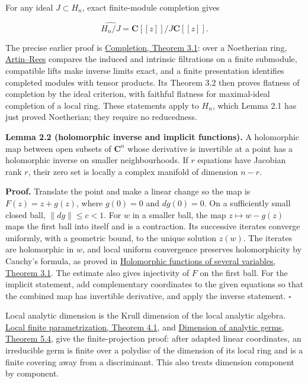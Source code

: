 \documentclass[11pt]{article}
\begin{document}
For any ideal \(J\subset H_n\), exact finite-module completion gives

\[
\widehat{H_n/J}=\mathbf C[[z]]/J\mathbf C[[z]].
\]

The precise earlier proof is
\href{../../../../../../AG-CA/AG-CA-19.html\#3-noetherian-exactness-tensoring-and-flatness}{Completion,
Theorem 3.1}: over a Noetherian ring, \href{../../../../../../AG-CA/AG-CA-03.html\#5-intersecting-a-filtration-with-a-submodule}{Artin--Rees} compares the induced
and intrinsic filtrations on a finite submodule, compatible lifts make
inverse limits exact, and a finite presentation identifies completed
modules with tensor products. Its Theorem 3.2 then proves flatness of
completion by the ideal criterion, with faithful flatness for
maximal-ideal completion of a local ring. These statements apply to
\(H_n\), which Lemma 2.1 has just proved Noetherian; they require no
reducedness.

\textbf{Lemma 2.2 (holomorphic inverse and implicit functions).} A
holomorphic map between open subsets of \(\mathbf C^n\) whose derivative
is invertible at a point has a holomorphic inverse on smaller
neighbourhoods. If \(r\) equations have Jacobian rank \(r\), their zero
set is locally a complex manifold of dimension \(n-r\).

\textbf{Proof.} Translate the point and make a linear change so the map
is \(F(z)=z+g(z)\), where \(g(0)=0\) and \(dg(0)=0\). On a sufficiently
small closed ball, \(\|dg\|\leq c<1\). For \(w\) in a smaller ball, the
map \(z\mapsto w-g(z)\) maps the first ball into itself and is a
contraction. Its successive iterates converge uniformly, with a
geometric bound, to the unique solution \(z(w)\). The iterates are
holomorphic in \(w\), and local uniform convergence preserves
holomorphicity by Cauchy's formula, as proved in \href{../../../../../../complex-analytic-spaces-and-coherent-sheaves/holomorphic-functions-of-several-variables.html\#3-limits-the-space-of-holomorphic-functions-and-montel-s-theorem}{Holomorphic functions of several variables, Theorem 3.1}. The estimate also gives injectivity
of \(F\) on the first ball. For the implicit statement, add
complementary coordinates to the given equations so that the combined
map has invertible derivative, and apply the inverse statement.
\(\square\)

Local analytic dimension is the Krull dimension of the local analytic
algebra.
\href{https://github.com/KokunoYumeto/open-math-courses/blob/6135e83fb8a8edcfb5c9e311a9d329ad169e8c22/docs/courses/complex-analytic-spaces-and-coherent-sheaves/src/analytic-germs-local-parametrization-and-the-nullstellensatz.md\#4-the-local-parametrization-theorem}{Local
finite parametrization, Theorem 4.1}, and
\href{https://github.com/KokunoYumeto/open-math-courses/blob/6135e83fb8a8edcfb5c9e311a9d329ad169e8c22/docs/courses/complex-analytic-spaces-and-coherent-sheaves/src/analytic-germs-local-parametrization-and-the-nullstellensatz.md\#5-the-nullstellensatz-and-dimension}{Dimension
of analytic germs, Theorem 5.4}, give the finite-projection proof: after
adapted linear coordinates, an irreducible germ is finite over a
polydisc of the dimension of its local ring and is a finite covering
away from a discriminant. This also treats dimension component by
component.
\end{document}
